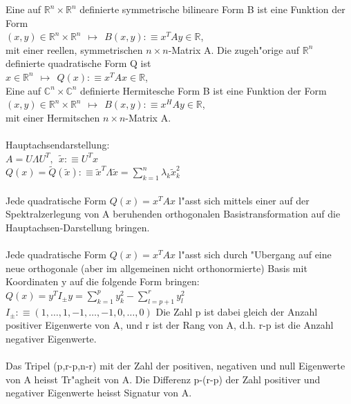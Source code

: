 \documentclass[10pt, a4paper, twocolumn]{scrartcl}
\begin{document}
Eine auf $\mathbb{R}^n \times \mathbb{R}^n$ definierte symmetrische bilineare Form B ist eine Funktion der Form\\
$(x,y)\in \mathbb{R}^n \times \mathbb{R}^n\:\:\mapsto\:\:B(x,y):\equiv x^TAy \in \mathbb{R}$,\\
mit einer reellen, symmetrischen $n \times n$-Matrix A. Die zugeh"orige auf $\mathbb{R}^n$ definierte quadratische Form Q ist\\
$x\in \mathbb{R}^n \:\:\mapsto\:\:Q(x):\equiv x^TAx \in \mathbb{R}$,\\
Eine auf $\mathbb{C}^n \times \mathbb{C}^n$ definierte Hermitesche Form B ist eine Funktion der Form\\
$(x,y)\in \mathbb{R}^n \times \mathbb{R}^n\:\:\mapsto\:\:B(x,y):\equiv x^HAy \in \mathbb{R}$,\\
mit einer Hermitschen $n \times n$-Matrix A.\\\\

Hauptachsendarstellung:\\
$A=U\Lambda U^T,\:\:\widetilde{x}:\equiv U^Tx$\\
$Q(x)=\widetilde{Q}(\widetilde{x}):\equiv\widetilde{x}^T\Lambda\widetilde{x}=\sum^n_{k=1}\lambda_k\widetilde{x}^2_k$\\\\

Jede quadratische Form $Q(x)=x^TAx$ l"asst sich mittels einer auf der Spektralzerlegung von A beruhenden orthogonalen Basistransformation auf die Hauptachsen-Darstellung bringen.\\\\

Jede quadratische Form $Q(x)=x^TAx$ l"asst sich durch "Ubergang auf eine neue orthogonale (aber im allgemeinen nicht orthonormierte) Basis mit Koordinaten y auf die folgende Form bringen:\\
$Q(x)=y^TI_{\pm} y=\sum^p_{k=1}y^2_k-\sum^r_{l=p+1}y^2_l$\\
$I_{\pm}:\equiv (1,\ldots,1,-1,\ldots,-1,0,\ldots,0)$
Die Zahl p ist dabei gleich der Anzahl positiver Eigenwerte von A, und r ist der Rang von A, d.h. r-p ist die Anzahl negativer Eigenwerte.\\\\

Das Tripel (p,r-p,n-r) mit der Zahl der positiven, negativen und null Eigenwerte von A heisst Tr"agheit von A. Die Differenz p-(r-p) der Zahl positiver und negativer Eigenwerte heisst Signatur von A.\\\\
\end{document}
